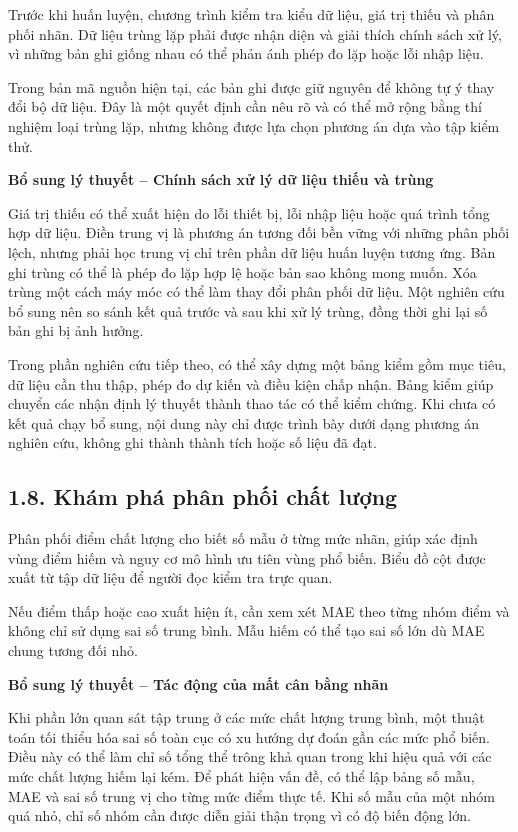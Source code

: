 \documentclass[12pt,a4paper,oneside]{article}
\begin{document}
Trước khi huấn luyện, chương trình kiểm tra kiểu dữ liệu, giá trị thiếu
và phân phối nhãn. Dữ liệu trùng lặp phải được nhận diện và giải thích
chính sách xử lý, vì những bản ghi giống nhau có thể phản ánh phép đo
lặp hoặc lỗi nhập liệu.

Trong bản mã nguồn hiện tại, các bản ghi được giữ nguyên để không tự ý
thay đổi bộ dữ liệu. Đây là một quyết định cần nêu rõ và có thể mở rộng
bằng thí nghiệm loại trùng lặp, nhưng không được lựa chọn phương án dựa
vào tập kiểm thử.


\par\noindent\textbf{Bổ sung lý thuyết -- Chính sách xử lý dữ liệu thiếu và trùng}\par
Giá trị thiếu có thể xuất hiện do lỗi thiết bị, lỗi nhập liệu hoặc quá trình tổng hợp dữ liệu. Điền trung vị là phương án tương đối bền vững với những phân phối lệch, nhưng phải học trung vị chỉ trên phần dữ liệu huấn luyện tương ứng. Bản ghi trùng có thể là phép đo lặp hợp lệ hoặc bản sao không mong muốn. Xóa trùng một cách máy móc có thể làm thay đổi phân phối dữ liệu. Một nghiên cứu bổ sung nên so sánh kết quả trước và sau khi xử lý trùng, đồng thời ghi lại số bản ghi bị ảnh hưởng.\par

Trong phần nghiên cứu tiếp theo, có thể xây dựng một bảng kiểm gồm mục tiêu, dữ liệu cần thu thập, phép đo dự kiến và điều kiện chấp nhận. Bảng kiểm giúp chuyển các nhận định lý thuyết thành thao tác có thể kiểm chứng. Khi chưa có kết quả chạy bổ sung, nội dung này chỉ được trình bày dưới dạng phương án nghiên cứu, không ghi thành thành tích hoặc số liệu đã đạt.\par

\subsection*{1.8. Khám phá phân phối chất lượng}

Phân phối điểm chất lượng cho biết số mẫu ở từng mức nhãn, giúp xác định
vùng điểm hiếm và nguy cơ mô hình ưu tiên vùng phổ biến. Biểu đồ cột
được xuất từ tập dữ liệu để người đọc kiểm tra trực quan.

Nếu điểm thấp hoặc cao xuất hiện ít, cần xem xét MAE theo từng nhóm điểm
và không chỉ sử dụng sai số trung bình. Mẫu hiếm có thể tạo sai số lớn
dù MAE chung tương đối nhỏ.


\par\noindent\textbf{Bổ sung lý thuyết -- Tác động của mất cân bằng nhãn}\par
Khi phần lớn quan sát tập trung ở các mức chất lượng trung bình, một thuật toán tối thiểu hóa sai số toàn cục có xu hướng dự đoán gần các mức phổ biến. Điều này có thể làm chỉ số tổng thể trông khả quan trong khi hiệu quả với các mức chất lượng hiếm lại kém. Để phát hiện vấn đề, có thể lập bảng số mẫu, MAE và sai số trung vị cho từng mức điểm thực tế. Khi số mẫu của một nhóm quá nhỏ, chỉ số nhóm cần được diễn giải thận trọng vì có độ biến động lớn.\par
\end{document}
